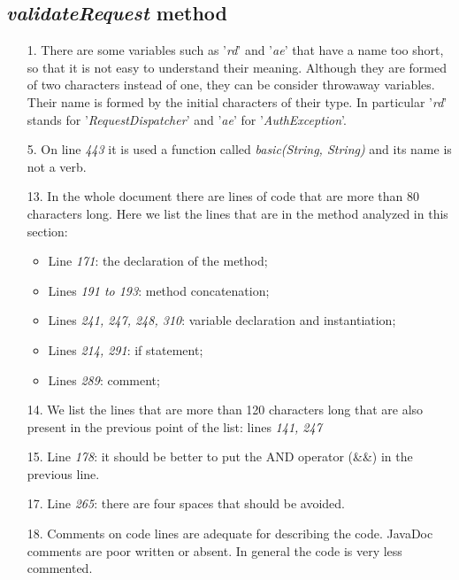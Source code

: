 \subsection{\textit{validateRequest} method}

\begin{itemize}
        \item[1.] 
           There are some variables such as '\textit{rd}' and '\textit{ae}' that have a name too short, so that it is not easy to understand their meaning. Although they are formed of two characters instead of one, they can be consider throwaway variables. Their name is formed by the initial characters of their type. In particular '\textit{rd}' stands for '\textit{RequestDispatcher}' and '\textit{ae}' for '\textit{AuthException}'.
        \item[5.] 
            On line \textit{443} it is used a function called \textit{basic(String, String)} and its name is not a verb.
        \item[13.] 
            In the whole document there are lines of code that are more than 80 characters long. 
            \newline
            Here we list the lines that are in the method analyzed in this section:
                \begin{itemize}
                    \item Line \textit{171}: the declaration of the method;
                    \item Lines \textit{191 to 193}: method concatenation;
                    \item Lines \textit{241, 247, 248, 310}: variable declaration and instantiation;
                    \item Lines \textit{214, 291}: if statement;
                    \item Lines \textit{289}: comment;
                \end{itemize}
        \item[14.] 
            We list the lines that are more than 120 characters long that are also present in the previous point of the list: lines \textit{141, 247}
        \item[15.] 
            Line \textit{178}: it should be better to put the AND operator (\&\&) in the previous line.
        \item[17.] 
            Line \textit{265}: there are four spaces that should be avoided.
        \item[18.] 
            Comments on code lines are adequate for describing the code. JavaDoc comments are poor written or absent. In general the code is very less commented.\\

\end{itemize}
